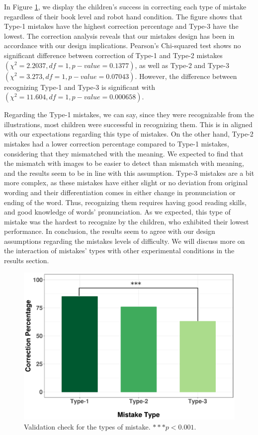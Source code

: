 \documentclass{sigchi}
\begin{document}
In Figure \ref{fig:MistakeCor}, we display the children's success in correcting each type of mistake regardless of their book level and robot hand condition.   
The figure shows that Type-1 mistakes have the highest correction percentage and Type-3 have the lowest.  
The correction analysis reveals that our mistakes design has been in accordance with our design implications.
Pearson's Chi-squared test shows no significant difference between correction of Type-1 and Type-2 mistakes $(\chi^2 = 2.2037, df = 1, p-value = 0.1377)$, as well as Type-2 and Type-3 $(\chi^2 = 3.273, df = 1, p-value = 0.07043)$.
However, the difference between recognizing Type-1 and Type-3 is significant with $(\chi^2 = 11.604, df = 1, p-value = 0.000658)$.



Regarding the Type-1 mistakes, we can say, since they were recognizable from the illustrations, most children were successful in recognizing them.
This is in aligned with our expectations regarding this type of mistakes.
On the other hand, Type-2 mistakes had a lower correction percentage compared to Type-1 mistakes, 
considering that they mismatched with the meaning.
We expected to find that the mismatch with images to be easier to detect than mismatch with meaning, and the results seem to be in line with this assumption. 
Type-3 mistakes are a bit more complex, as these mistakes have either slight or no deviation from original wording and their differentiation comes in either change in pronunciation or ending of the word.
Thus, recognizing them requires having good reading skills, and good knowledge of words' pronunciation.
As we expected, this type of mistake was the hardest to recognize by the children, who exhibited their lowest performance.
In conclusion, the results seem to agree with our design assumptions regarding the mistakes levels of difficulty. 
We will discuss more on the interaction of mistakes' types  with other experimental conditions in the results section.

\begin{figure}[t]
  \centering
  \includegraphics[width=1\linewidth]{figures/cVt.pdf}
  \caption{Validation check for the types of mistake. $***p<0.001$.}
  \label{fig:MistakeCor}
\end{figure}
\end{document}
